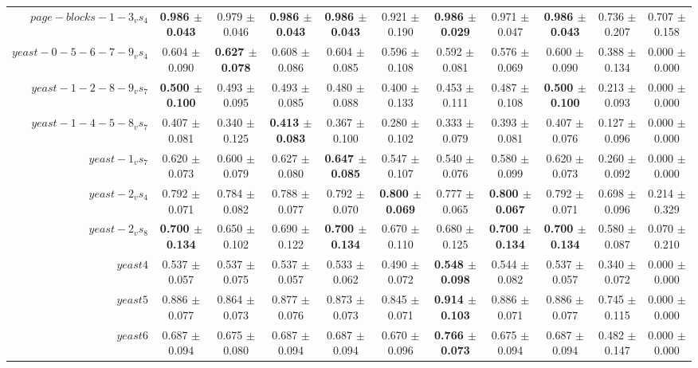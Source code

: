 \begin{table}[!ht]
{\begin{tabular}{r c c c c c c c c c c}
$page-blocks-1-3_vs_4$ & \textbf{0.986 $\pm$ 0.043} & 0.979 $\pm$ 0.046 & \textbf{0.986 $\pm$ 0.043} & \textbf{0.986 $\pm$ 0.043} & 0.921 $\pm$ 0.190 & \textbf{0.986 $\pm$ 0.029} & 0.971 $\pm$ 0.047 & \textbf{0.986 $\pm$ 0.043} & 0.736 $\pm$ 0.207 & 0.707 $\pm$ 0.158 \\
$yeast-0-5-6-7-9_vs_4$ & 0.604 $\pm$ 0.090 & \textbf{0.627 $\pm$ 0.078} & 0.608 $\pm$ 0.086 & 0.604 $\pm$ 0.085 & 0.596 $\pm$ 0.108 & 0.592 $\pm$ 0.081 & 0.576 $\pm$ 0.069 & 0.600 $\pm$ 0.090 & 0.388 $\pm$ 0.134 & 0.000 $\pm$ 0.000 \\
$yeast-1-2-8-9_vs_7$ & \textbf{0.500 $\pm$ 0.100} & 0.493 $\pm$ 0.095 & 0.493 $\pm$ 0.085 & 0.480 $\pm$ 0.088 & 0.400 $\pm$ 0.133 & 0.453 $\pm$ 0.111 & 0.487 $\pm$ 0.108 & \textbf{0.500 $\pm$ 0.100} & 0.213 $\pm$ 0.093 & 0.000 $\pm$ 0.000 \\
$yeast-1-4-5-8_vs_7$ & 0.407 $\pm$ 0.081 & 0.340 $\pm$ 0.125 & \textbf{0.413 $\pm$ 0.083} & 0.367 $\pm$ 0.100 & 0.280 $\pm$ 0.102 & 0.333 $\pm$ 0.079 & 0.393 $\pm$ 0.081 & 0.407 $\pm$ 0.076 & 0.127 $\pm$ 0.096 & 0.000 $\pm$ 0.000 \\
$yeast-1_vs_7$ & 0.620 $\pm$ 0.073 & 0.600 $\pm$ 0.079 & 0.627 $\pm$ 0.080 & \textbf{0.647 $\pm$ 0.085} & 0.547 $\pm$ 0.107 & 0.540 $\pm$ 0.076 & 0.580 $\pm$ 0.099 & 0.620 $\pm$ 0.073 & 0.260 $\pm$ 0.092 & 0.000 $\pm$ 0.000 \\
$yeast-2_vs_4$ & 0.792 $\pm$ 0.071 & 0.784 $\pm$ 0.082 & 0.788 $\pm$ 0.077 & 0.792 $\pm$ 0.070 & \textbf{0.800 $\pm$ 0.069} & 0.777 $\pm$ 0.065 & \textbf{0.800 $\pm$ 0.067} & 0.792 $\pm$ 0.071 & 0.698 $\pm$ 0.096 & 0.214 $\pm$ 0.329 \\
$yeast-2_vs_8$ & \textbf{0.700 $\pm$ 0.134} & 0.650 $\pm$ 0.102 & 0.690 $\pm$ 0.122 & \textbf{0.700 $\pm$ 0.134} & 0.670 $\pm$ 0.110 & 0.680 $\pm$ 0.125 & \textbf{0.700 $\pm$ 0.134} & \textbf{0.700 $\pm$ 0.134} & 0.580 $\pm$ 0.087 & 0.070 $\pm$ 0.210 \\
$yeast4$ & 0.537 $\pm$ 0.057 & 0.537 $\pm$ 0.075 & 0.537 $\pm$ 0.057 & 0.533 $\pm$ 0.062 & 0.490 $\pm$ 0.072 & \textbf{0.548 $\pm$ 0.098} & 0.544 $\pm$ 0.082 & 0.537 $\pm$ 0.057 & 0.340 $\pm$ 0.072 & 0.000 $\pm$ 0.000 \\
$yeast5$ & 0.886 $\pm$ 0.077 & 0.864 $\pm$ 0.073 & 0.877 $\pm$ 0.076 & 0.873 $\pm$ 0.073 & 0.845 $\pm$ 0.071 & \textbf{0.914 $\pm$ 0.103} & 0.886 $\pm$ 0.071 & 0.886 $\pm$ 0.077 & 0.745 $\pm$ 0.115 & 0.000 $\pm$ 0.000 \\
$yeast6$ & 0.687 $\pm$ 0.094 & 0.675 $\pm$ 0.080 & 0.687 $\pm$ 0.094 & 0.687 $\pm$ 0.094 & 0.670 $\pm$ 0.096 & \textbf{0.766 $\pm$ 0.073} & 0.675 $\pm$ 0.094 & 0.687 $\pm$ 0.094 & 0.482 $\pm$ 0.147 & 0.000 $\pm$ 0.000 \\

\end{tabular}}
\end{table}
